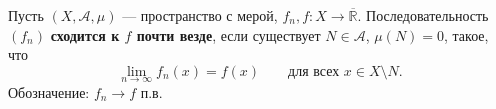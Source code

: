 \label{definition:32}

\begin{definition}
Пусть $(X,\mathcal A,\mu)$ --- пространство с мерой, $f_n,f:X\to\overline{\mathbb R}$.
Последовательность $(f_n)$ \textbf{сходится к $f$ почти везде}, если существует $N\in\mathcal A$, $\mu(N)=0$, такое, что
\[
  \lim_{n\to\infty}f_n(x)=f(x)\qquad\text{для всех }x\in X\setminus N.
\]
Обозначение: $f_n\to f$ п.в.
\end{definition}
